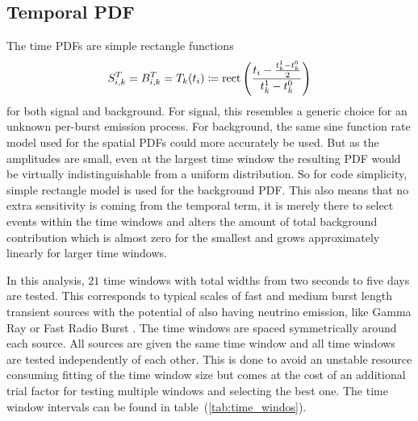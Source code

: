 \subsection*{Temporal PDF}
The time PDFs are simple rectangle functions
\begin{equation}
  S_{i,k}^T = B_{i,k}^T = T_k(t_i) \coloneqq
    \operatorname{rect}\left(\frac{t_i - \frac{t_k^1-t_k^0}{2}}
                              {t_k^1-t_k^0}\right)
\end{equation}
for both signal and background.
For signal, this resembles a generic choice for an unknown per-burst emission process.
For background, the same sine function rate model used for the spatial PDFs could more accurately be used.
But as the amplitudes are small, even at the largest time window the resulting PDF would be virtually indistinguishable from a uniform distribution.
So for code simplicity, simple rectangle model is used for the background PDF.
This also means that no extra sensitivity is coming from the temporal term, it is merely there to select events within the time windows and alters the amount of total background contribution which is almost zero for the smallest and grows approximately linearly for larger time windows.

In this analysis, $\num{21}$ time windows with total widths from two seconds to five days are tested.
This corresponds to typical scales of fast and medium burst length transient sources with the potential of also having neutrino emission, like Gamma Ray or Fast Radio Burst \cite{Gompertz:2017bif,Hessels:2018zvt}.
The time windows are spaced symmetrically around each source.
All sources are given the same time window and all time windows are tested independently of each other.
This is done to avoid an unstable resource consuming fitting of the time window size but comes at the cost of an additional trial factor for testing multiple windows and selecting the best one.
The time window intervals can be found in table~(\ref{tab:time_windos}).

